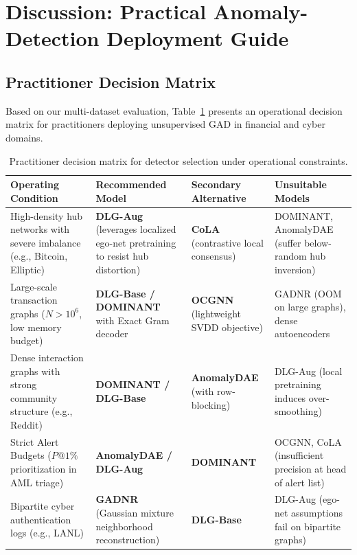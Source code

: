\documentclass[11pt,a4paper]{article}
\begin{document}
\section{Discussion: Practical Anomaly-Detection Deployment Guide}
\label{sec:discussion}

\subsection{Practitioner Decision Matrix}
Based on our multi-dataset evaluation, Table~\ref{tab:decision_matrix} presents an operational decision matrix for practitioners deploying unsupervised GAD in financial and cyber domains.

\begin{table}[htbp]
\centering\footnotesize\setlength{\tabcolsep}{4pt}
\caption{Practitioner decision matrix for detector selection under operational constraints.}
\label{tab:decision_matrix}
\begin{tabularx}{\textwidth}{>{\raggedright\arraybackslash}p{}>{\raggedright\arraybackslash}X>{\raggedright\arraybackslash}X>{\raggedright\arraybackslash}p{}}\toprule
\textbf{Operating Condition} & \textbf{Recommended Model} & \textbf{Secondary Alternative} & \textbf{Unsuitable Models} \\\midrule
High-density hub networks with severe imbalance (e.g., Bitcoin, Elliptic) & \textbf{DLG-Aug} (leverages localized ego-net pretraining to resist hub distortion) & \textbf{CoLA} (contrastive local consensus) & DOMINANT, AnomalyDAE (suffer below-random hub inversion) \\
Large-scale transaction graphs ($N > 10^6$, low memory budget) & \textbf{DLG-Base / DOMINANT} with Exact Gram decoder & \textbf{OCGNN} (lightweight SVDD objective) & GADNR (OOM on large graphs), dense autoencoders \\
Dense interaction graphs with strong community structure (e.g., Reddit) & \textbf{DOMINANT / DLG-Base} & \textbf{AnomalyDAE} (with row-blocking) & DLG-Aug (local pretraining induces over-smoothing) \\
Strict Alert Budgets ($P@1\%$ prioritization in AML triage) & \textbf{AnomalyDAE / DLG-Aug} & \textbf{DOMINANT} & OCGNN, CoLA (insufficient precision at head of alert list) \\
Bipartite cyber authentication logs (e.g., LANL) & \textbf{GADNR} (Gaussian mixture neighborhood reconstruction) & \textbf{DLG-Base} & DLG-Aug (ego-net assumptions fail on bipartite graphs) \\\bottomrule
\end{tabularx}
\end{table}
\end{document}
